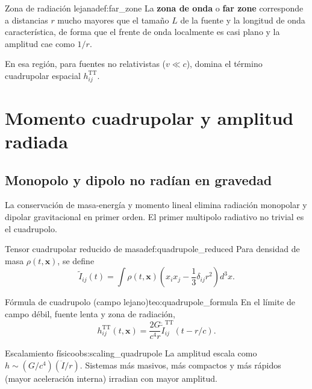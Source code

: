 \begin{definicion}{Zona de radiación lejana}{def:far_zone}
La \textbf{zona de onda} o \textbf{far zone} corresponde a distancias $r$ mucho mayores que el tamaño $L$ de la fuente y la longitud de onda característica, de forma que el frente de onda localmente es casi plano y la amplitud cae como $1/r$.
\end{definicion}

En esa región, para fuentes no relativistas ($v\ll c$), domina el término cuadrupolar espacial $h_{ij}^{\mathrm{TT}}$.

\section{Momento cuadrupolar y amplitud radiada}
\label{sec:quadrupole_amplitude}

\subsection{Monopolo y dipolo no radían en gravedad}

La conservación de masa-energía y momento lineal elimina radiación monopolar y dipolar gravitacional en primer orden. El primer multipolo radiativo no trivial es el cuadrupolo.

\begin{definicion}{Tensor cuadrupolar reducido de masa}{def:quadrupole_reduced}
Para densidad de masa $\rho(t,\mathbf{x})$, se define
\begin{equation}
  \tilde I_{ij}(t)
  =
  \int \rho(t,\mathbf{x})
  \left(x_i x_j-\frac{1}{3}\delta_{ij}r^2\right)
  d^3x.
\end{equation}
\end{definicion}

\begin{teorema}{Fórmula de cuadrupolo (campo lejano)}{teo:quadrupole_formula}
En el límite de campo débil, fuente lenta y zona de radiación,
\begin{equation}
  h_{ij}^{\mathrm{TT}}(t,\mathbf{x})
  =
  \frac{2G}{c^4 r}
  \ddot{\tilde I}_{ij}^{\mathrm{TT}}(t-r/c).
  \label{eq:quadrupole_h}
\end{equation}
\end{teorema}

\begin{observacion}{Escalamiento físico}{obs:scaling_quadrupole}
La amplitud escala como $h\sim (G/c^4)(\ddot I/r)$. Sistemas más masivos, más compactos y más rápidos (mayor aceleración interna) irradian con mayor amplitud.
\end{observacion}

